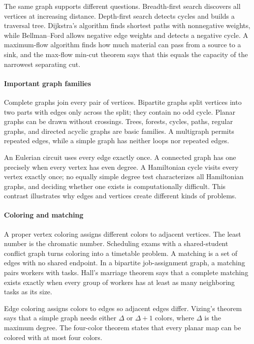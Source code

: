The same graph supports different questions. Breadth-first search discovers all vertices at increasing distance. Depth-first search detects cycles and builds a traversal tree. Dijkstra's algorithm finds shortest paths with nonnegative weights, while Bellman--Ford allows negative edge weights and detects a negative cycle. A maximum-flow algorithm finds how much material can pass from a source to a sink, and the max-flow min-cut theorem says that this equals the capacity of the narrowest separating cut.

\paragraph{Important graph families}
Complete graphs join every pair of vertices. Bipartite graphs split vertices into two parts with edges only across the split; they contain no odd cycle. Planar graphs can be drawn without crossings. Trees, forests, cycles, paths, regular graphs, and directed acyclic graphs are basic families. A multigraph permits repeated edges, while a simple graph has neither loops nor repeated edges.

An Eulerian circuit uses every edge exactly once. A connected graph has one precisely when every vertex has even degree. A Hamiltonian cycle visits every vertex exactly once; no equally simple degree test characterizes all Hamiltonian graphs, and deciding whether one exists is computationally difficult. This contrast illustrates why edges and vertices create different kinds of problems.

\paragraph{Coloring and matching}
A proper vertex coloring assigns different colors to adjacent vertices. The least number is the chromatic number. Scheduling exams with a shared-student conflict graph turns coloring into a timetable problem. A matching is a set of edges with no shared endpoint. In a bipartite job-assignment graph, a matching pairs workers with tasks. Hall's marriage theorem says that a complete matching exists exactly when every group of workers has at least as many neighboring tasks as its size.

Edge coloring assigns colors to edges so adjacent edges differ. Vizing's theorem says that a simple graph needs either $\Delta$ or $\Delta+1$ colors, where $\Delta$ is the maximum degree. The four-color theorem states that every planar map can be colored with at most four colors.

